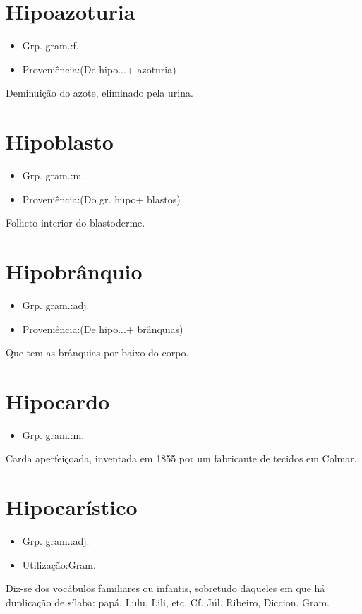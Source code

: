 \documentclass{article}
\begin{document}
\section{Hipoazoturia}
\begin{itemize}
\item {Grp. gram.:f.}
\end{itemize}
\begin{itemize}
\item {Proveniência:(De \textunderscore hipo...\textunderscore  + \textunderscore azoturia\textunderscore )}
\end{itemize}
Deminuição do azote, eliminado pela urina.
\section{Hipoblasto}
\begin{itemize}
\item {Grp. gram.:m.}
\end{itemize}
\begin{itemize}
\item {Proveniência:(Do gr. \textunderscore hupo\textunderscore  + \textunderscore blastos\textunderscore )}
\end{itemize}
Folheto interior do blastoderme.
\section{Hipobrânquio}
\begin{itemize}
\item {Grp. gram.:adj.}
\end{itemize}
\begin{itemize}
\item {Proveniência:(De \textunderscore hipo...\textunderscore  + \textunderscore brânquias\textunderscore )}
\end{itemize}
Que tem as brânquias por baixo do corpo.
\section{Hipocardo}
\begin{itemize}
\item {Grp. gram.:m.}
\end{itemize}
Carda aperfeiçoada, inventada em 1855 por um fabricante de tecidos em Colmar.
\section{Hipocarístico}
\begin{itemize}
\item {Grp. gram.:adj.}
\end{itemize}
\begin{itemize}
\item {Utilização:Gram.}
\end{itemize}
Diz-se dos vocábulos familiares ou infantis, sobretudo daqueles em que há duplicação de sílaba: \textunderscore papá\textunderscore , \textunderscore Lulu\textunderscore , \textunderscore Lili\textunderscore , etc. Cf. Júl. Ribeiro, \textunderscore Diccion. Gram.\textunderscore 
\end{document}
